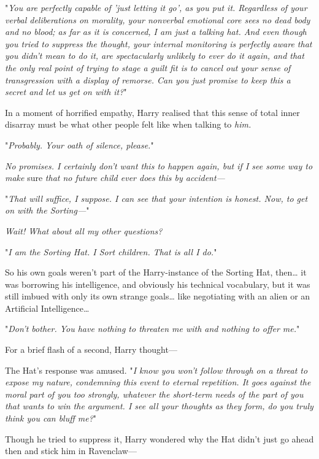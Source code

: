 "\emph{You are perfectly capable of 'just letting it go', as you put it. 
Regardless of your verbal deliberations on morality, your nonverbal emotional 
core sees no dead body and no blood; as far as it is concerned, I am just a 
talking hat. And even though you tried to suppress the thought, your internal 
monitoring is perfectly aware that you didn't mean to do it, are spectacularly 
unlikely to ever do it again, and that the only real point of trying to stage a 
guilt fit is to cancel out your sense of transgression with a display of 
remorse. Can you just promise to keep this a secret and let us get on with it?}"

In a moment of horrified empathy, Harry realised that this sense of total inner 
disarray must be what other people felt like when talking to \emph{him.}

"\emph{Probably. Your oath of silence, please.}"

\emph{No promises. I certainly don't want this to happen again, but if I see 
some way to make} sure\emph{ that no future child ever does this by accident---}

"\emph{That will suffice, I suppose. I can see that your intention is honest. 
Now, to get on with the Sorting---}"

\emph{Wait! What about all my other questions?}

"\emph{I am the Sorting Hat. I Sort children. That is all I do.}"

So his own goals weren't part of the Harry-instance of the Sorting Hat, 
then{\ldots} it was borrowing his intelligence, and obviously his technical 
vocabulary, but it was still imbued with only its own strange goals{\ldots} 
like negotiating with an alien or an Artificial Intelligence{\ldots}

"\emph{Don't bother. You have nothing to threaten me with and nothing to offer 
me.}"

For a brief flash of a second, Harry thought---

The Hat's response was amused. "\emph{I know you won't follow through on a 
threat to expose my nature, condemning this event to eternal repetition. It 
goes against the moral part of you too strongly, whatever the short-term needs 
of the part of you that wants to win the argument. I see all your thoughts as 
they form, do you truly think you can bluff me?}"

Though he tried to suppress it, Harry wondered why the Hat didn't just go ahead 
then and stick him in Ravenclaw---

